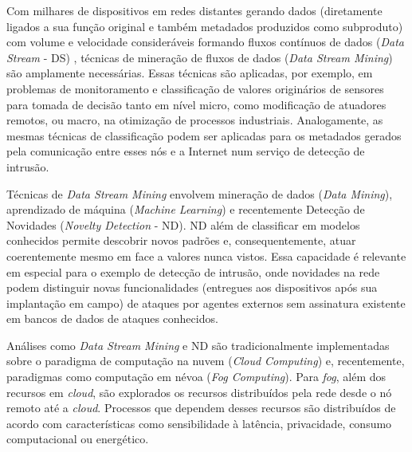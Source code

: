 
Com milhares de dispositivos em redes distantes gerando dados (diretamente
ligados a sua função original e também metadados produzidos como subproduto) com
volume e velocidade consideráveis formando fluxos contínuos de dados (\emph{Data
Stream} - DS) , técnicas de mineração de fluxos de dados
(\emph{Data Stream Mining}) são amplamente necessárias.
Essas técnicas são
aplicadas, por exemplo, em problemas de monitoramento e classificação de valores
originários de sensores para tomada de decisão tanto em nível micro, como
modificação de atuadores remotos, ou macro, na otimização de processos
industriais.
Analogamente, as mesmas técnicas de classificação podem ser aplicadas para os
metadados gerados pela comunicação entre esses nós e a Internet num serviço de
detecção de intrusão.


Técnicas de \emph{Data Stream Mining} envolvem mineração de dados
(\emph{Data Mining}), aprendizado de
máquina (\emph{Machine Learning}) e recentemente Detecção de Novidades
(\emph{Novelty Detection} - ND). ND além de classificar em modelos conhecidos
permite descobrir novos padrões e, consequentemente, atuar coerentemente mesmo
em face a valores nunca vistos. Essa capacidade é relevante em especial para o
exemplo de detecção de intrusão, onde novidades na rede podem distinguir novas
funcionalidades (entregues aos dispositivos após sua implantação em campo) de
ataques por agentes externos sem assinatura existente em bancos de
dados de ataques conhecidos.


Análises como \emph{Data Stream Mining} e ND são tradicionalmente implementadas
sobre o paradigma de computação na nuvem
(\emph{Cloud Computing}) e, recentemente, paradigmas como computação em névoa
(\emph{Fog Computing}). Para \emph{fog}, além dos recursos em \emph{cloud}, são
explorados os recursos distribuídos pela rede desde o nó remoto até a
\emph{cloud}. Processos que dependem desses recursos são distribuídos de acordo
com características como sensibilidade à latência, privacidade,
consumo computacional ou energético.


